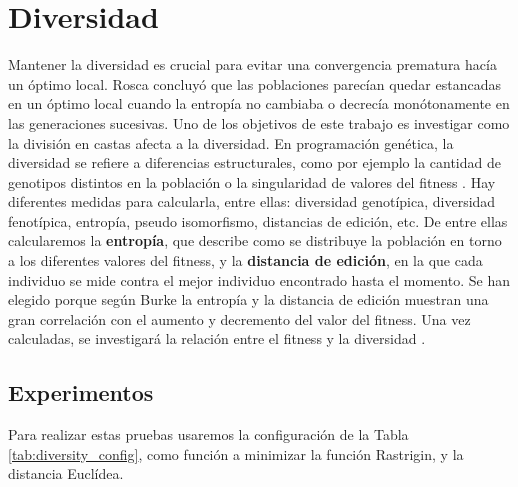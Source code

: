 \section{Diversidad}

Mantener la diversidad es crucial para evitar una convergencia prematura hacía un óptimo local. Rosca \cite{Rosca} concluyó que las poblaciones parecían quedar estancadas
en un óptimo local cuando la entropía no cambiaba o decrecía monótonamente en las generaciones sucesivas. Uno de los objetivos de este trabajo es investigar como la 
división en castas afecta a la diversidad. En programación genética, la diversidad se refiere a diferencias estructurales, como por ejemplo la cantidad de genotipos 
distintos en la población o la singularidad de valores del fitness \cite{genetic}. Hay diferentes medidas para calcularla, entre ellas: diversidad genotípica, 
diversidad fenotípica, entropía, pseudo isomorfismo, distancias de edición, etc. De entre ellas calcularemos la \textbf{entropía}, que describe como se distribuye la
población en torno a los diferentes valores del fitness, y la \textbf{distancia de edición}, en la que cada individuo se mide contra el mejor individuo encontrado hasta el 
momento. Se han elegido porque según Burke \cite{diversity} la entropía y la distancia de edición muestran una gran correlación con el aumento y decremento del valor 
del fitness. Una vez calculadas, se investigará la relación entre el fitness y la diversidad \cite{diversity}. 

\subsection{Experimentos}

Para realizar estas pruebas usaremos la configuración de la Tabla \ref{tab:diversity_config}, como función a minimizar la función Rastrigin\cite{BBOB}, y la distancia Euclídea.


